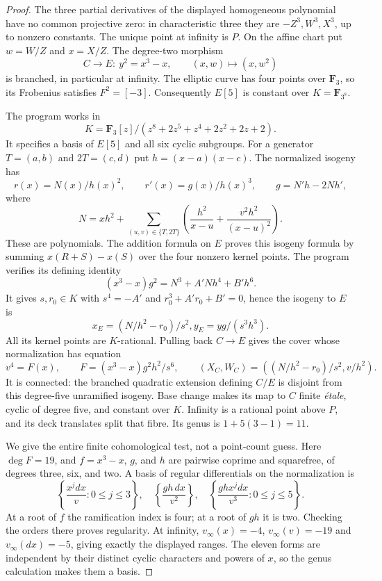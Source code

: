 \begin{proof}
The three partial derivatives of the displayed homogeneous
polynomial have no common projective zero: in characteristic
three they are $-Z^3,W^3,X^3$, up to nonzero constants.
The unique point at infinity is $P$. On the affine chart put
$w=W/Z$ and $x=X/Z$. The degree-two morphism
\[
       C\longrightarrow E:\ y^2=x^3-x,
                    \qquad (x,w)\longmapsto(x,w^2)
\]
is branched, in particular at infinity. The elliptic curve has
four points over $\mathbf F_3$, so its Frobenius satisfies
$F^2=[-3]$. Consequently $E[5]$ is constant over
$K=\mathbf F_{3^8}$.

The program  works in
\[
 K=\mathbf F_3[z]/
       (z^8+2z^5+z^4+2z^2+2z+2).
\]
It specifies a basis of $E[5]$ and all six cyclic subgroups.
For a generator $T=(a,b)$ and $2T=(c,d)$ put
$h=(x-a)(x-c)$. The normalized isogeny has
\[
 r(x)=N(x)/h(x)^2,
 \qquad r'(x)=g(x)/h(x)^3,\qquad
       g=N'h-2Nh',
\]
where
\[
 N=xh^2+
       \sum_{(u,v)\in\{T,2T\}}
        \left(\frac{h^2}{x-u}+\frac{v^2h^2}{(x-u)^2}\right).
\]
These are polynomials. The addition formula on $E$ proves
this isogeny formula by summing $x(R+S)-x(S)$ over the four
nonzero kernel points. The program verifies its defining
identity
\[
 (x^3-x)g^2=N^3+A'Nh^4+B'h^6.
\]
It gives $s,r_0\in K$ with $s^4=-A'$ and
$r_0^3+A'r_0+B'=0$, hence the isogeny to $E$ is
\[
       x_E=(N/h^2-r_0)/s^2,
       y_E=yg/(s^3h^3).
\]
All its kernel points are $K$-rational. Pulling back
$C\to E$ gives the cover whose normalization has equation
\[
       v^4=F(x),\qquad
       F=(x^3-x)g^2h^2/s^6,\qquad
       (X_C,W_C)=((N/h^2-r_0)/s^2,v/h^2).              \tag{B.Q.1}
\]
It is connected: the branched quadratic extension defining
$C/E$ is disjoint from this degree-five unramified isogeny.
Base change makes its map to $C$ finite \emph{\'etale}, cyclic
of degree five, and constant over $K$. Infinity is a rational
point above $P$, and its deck translates split that fibre.
Its genus is $1+5(3-1)=11$.

We give the entire finite cohomological test, not a point-count
guess. Here $\deg F=19$, and $f=x^3-x$, $g$, and $h$ are
pairwise coprime and squarefree, of degrees three, six, and two.
A basis of regular differentials on the normalization is
\[
 \left\{\frac{x^jdx}{v}:0\le j\le3\right\},\quad
 \left\{\frac{gh\,dx}{v^2}\right\},\quad
 \left\{\frac{ghx^jdx}{v^3}:0\le j\le5\right\}.       \tag{B.Q.2}
\]
At a root of $f$ the ramification index is four; at a root of
$gh$ it is two. Checking the orders there proves regularity.
At infinity, $v_\infty(x)=-4$, $v_\infty(v)=-19$ and
$v_\infty(dx)=-5$, giving exactly the displayed ranges.
The eleven forms are independent by their distinct cyclic
characters and powers of $x$, so the genus calculation makes
them a basis.


\end{proof}
